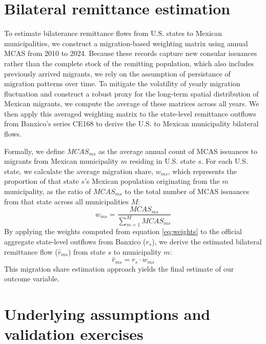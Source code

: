 \section{Bilateral remittance estimation} \label{sec:remittance-estimation}

To estimate bilaterance remittance flows from U.S. states to Mexican municipalities, we construct a migration-based weighting matrix using annual MCAS from 2010 to 2024. Because these records capture new consular issuances rather than the complete stock of the remitting population, which also includes previously arrived migrants, we rely on the assumption of persistance of migration patterns over time. To mitigate the volatility of yearly migration fluctuation and construct a robust proxy for the long-term spatial distribution of Mexican migrants, we compute the average of these matrices across all years. We then apply this averaged weighting matrix to the state-level remittance outflows from Banxico's series CE168 to derive the U.S. to Mexican municipality bilateral flows. 

\par

Formally, we define $MCAS_{ms}$ as the average annual count of MCAS issuances to migrants from Mexican municipality $m$ residing in U.S. state $s$. For each U.S. state, we calculate the average migration share, $w_{ms}$, which represents the proportion of that state $s$'s Mexican population originating from the $m$ municipality, as the ratio of $MCAS_{ms}$ to the total number of MCAS issuances from that state across all municipalities $M$:
\begin{equation} \label{eq:weights}
    w_{ms} = \frac{MCAS_{ms}}{\sum_{m=1}^{M} MCAS_{ms}}
\end{equation}
By applying the weights computed from equation \eqref{eq:weights} to the official aggregate state-level outflows from Banxico ($r_s$), we derive the estimated bilateral remittance flow ($\hat{r}_{ms}$) from state $s$ to municipality $m$:
\begin{equation}
    \hat{r}_{ms} = r_s \cdot w_{ms}
\end{equation}
This migration share estimation approach yields the final estimate of our outcome variable. 

\section{Underlying assumptions and validation exercises}

